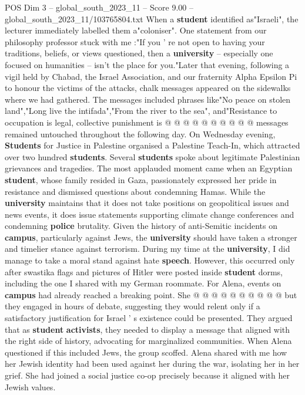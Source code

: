 \begin{textsample}{POS Dim 3 – global\_south\_2023\_11 – Score 9.00 – global\_south\_2023\_11/103765804.txt}
When a \textbf{student} identified as"Israeli", the lecturer immediately labelled them a"coloniser".
One statement from our philosophy professor stuck with me :"If you ' re not open to having your traditions, beliefs, or views questioned, then a \textbf{university} -- especially one focused on humanities -- isn't the place for you."Later that evening, following a vigil held by Chabad, the Israel Association, and our fraternity Alpha Epsilon Pi to honour the victims of the attacks, chalk messages appeared on the sidewalks where we had gathered.
The messages included phrases like"No peace on stolen land","Long live the intifada","From the river to the sea", and"Resistance to occupation is legal, collective punishment is @ @ @ @ @ @ @ @ @ @ messages remained untouched throughout the following day.
On Wednesday evening, \textbf{Students} for Justice in Palestine organised a Palestine Teach-In, which attracted over two hundred \textbf{students}.
Several \textbf{students} spoke about legitimate Palestinian grievances and tragedies.
The most applauded moment came when an Egyptian \textbf{student}, whose family resided in Gaza, passionately expressed her pride in resistance and dismissed questions about condemning Hamas.
While the \textbf{university} maintains that it does not take positions on geopolitical issues and news events, it does issue statements supporting climate change conferences and condemning \textbf{police} brutality.
Given the history of anti-Semitic incidents on \textbf{campus}, particularly against Jews, the \textbf{university} should have taken a stronger and timelier stance against terrorism.
During my time at the \textbf{university}, I did manage to take a moral stand against hate \textbf{speech}.
However, this occurred only after swastika flags and pictures of Hitler were posted inside \textbf{student} dorms, including the one I shared with my German roommate.
For Alena, events on \textbf{campus} had already reached a breaking point.
She @ @ @ @ @ @ @ @ @ @ but they engaged in hours of debate, suggesting they would relent only if a satisfactory justification for Israel ' s existence could be presented.
They argued that as \textbf{student} \textbf{activists}, they needed to display a message that aligned with the right side of history, advocating for marginalized communities.
When Alena questioned if this included Jews, the group scoffed.
Alena shared with me how her Jewish identity had been used against her during the war, isolating her in her grief.
She had joined a social justice co-op precisely because it aligned with her Jewish values.

\end{textsample}
